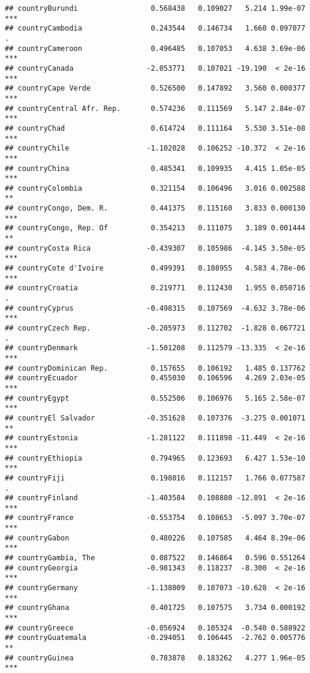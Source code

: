 \documentclass[
  11pt,
]{article}
\begin{document}
\begin{verbatim}
## countryBurundi                 0.568438   0.109027   5.214 1.99e-07 ***
## countryCambodia                0.243544   0.146734   1.660 0.097077 .  
## countryCameroon                0.496485   0.107053   4.638 3.69e-06 ***
## countryCanada                 -2.053771   0.107021 -19.190  < 2e-16 ***
## countryCape Verde              0.526500   0.147892   3.560 0.000377 ***
## countryCentral Afr. Rep.       0.574236   0.111569   5.147 2.84e-07 ***
## countryChad                    0.614724   0.111164   5.530 3.51e-08 ***
## countryChile                  -1.102028   0.106252 -10.372  < 2e-16 ***
## countryChina                   0.485341   0.109935   4.415 1.05e-05 ***
## countryColombia                0.321154   0.106496   3.016 0.002588 ** 
## countryCongo, Dem. R.          0.441375   0.115160   3.833 0.000130 ***
## countryCongo, Rep. Of          0.354213   0.111075   3.189 0.001444 ** 
## countryCosta Rica             -0.439307   0.105986  -4.145 3.50e-05 ***
## countryCote d'Ivoire           0.499391   0.108955   4.583 4.78e-06 ***
## countryCroatia                 0.219771   0.112430   1.955 0.050716 .  
## countryCyprus                 -0.498315   0.107569  -4.632 3.78e-06 ***
## countryCzech Rep.             -0.205973   0.112702  -1.828 0.067721 .  
## countryDenmark                -1.501208   0.112579 -13.335  < 2e-16 ***
## countryDominican Rep.          0.157655   0.106192   1.485 0.137762    
## countryEcuador                 0.455030   0.106596   4.269 2.03e-05 ***
## countryEgypt                   0.552506   0.106976   5.165 2.58e-07 ***
## countryEl Salvador            -0.351628   0.107376  -3.275 0.001071 ** 
## countryEstonia                -1.281122   0.111898 -11.449  < 2e-16 ***
## countryEthiopia                0.794965   0.123693   6.427 1.53e-10 ***
## countryFiji                    0.198016   0.112157   1.766 0.077587 .  
## countryFinland                -1.403584   0.108880 -12.891  < 2e-16 ***
## countryFrance                 -0.553754   0.108653  -5.097 3.70e-07 ***
## countryGabon                   0.480226   0.107585   4.464 8.39e-06 ***
## countryGambia, The             0.087522   0.146864   0.596 0.551264    
## countryGeorgia                -0.981343   0.118237  -8.300  < 2e-16 ***
## countryGermany                -1.138009   0.107073 -10.628  < 2e-16 ***
## countryGhana                   0.401725   0.107575   3.734 0.000192 ***
## countryGreece                 -0.056924   0.105324  -0.540 0.588922    
## countryGuatemala              -0.294051   0.106445  -2.762 0.005776 ** 
## countryGuinea                  0.783878   0.183262   4.277 1.96e-05 ***

\end{verbatim}
\end{document}
